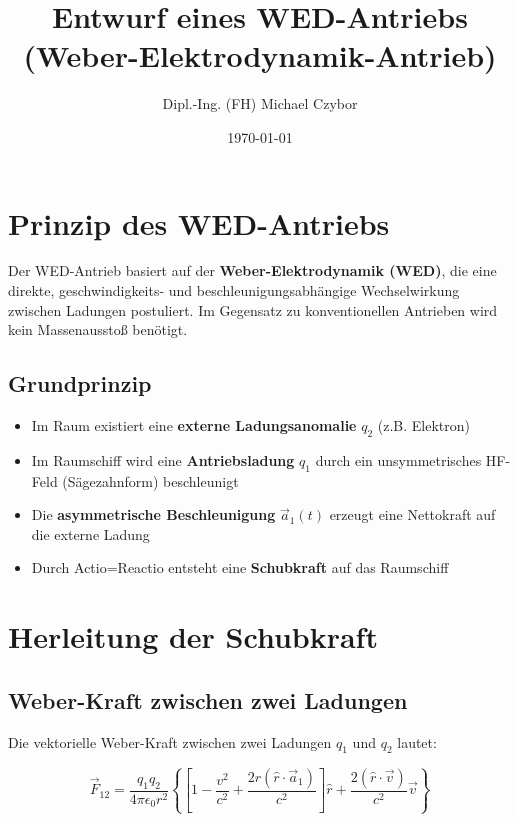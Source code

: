 \documentclass[11pt, a4paper]{article}
\title{Entwurf eines WED-Antriebs \\ (Weber-Elektrodynamik-Antrieb)}
\author{Dipl.-Ing. (FH) Michael Czybor}
\date{\today}
\begin{document}
\maketitle

\section{Prinzip des WED-Antriebs}

Der WED-Antrieb basiert auf der \textbf{Weber-Elektrodynamik (WED)}, die eine direkte, geschwindigkeits- und beschleunigungsabhängige Wechselwirkung zwischen Ladungen
postuliert. Im Gegensatz zu konventionellen Antrieben wird kein Massenausstoß benötigt.

\subsection{Grundprinzip}

\begin{itemize}
    \item Im Raum existiert eine \textbf{externe Ladungsanomalie} $q_2$ (z.B. Elektron)
    \item Im Raumschiff wird eine \textbf{Antriebsladung} $q_1$ durch ein unsymmetrisches HF-Feld (Sägezahnform) beschleunigt
    \item Die \textbf{asymmetrische Beschleunigung} $\vec{a}_1(t)$ erzeugt eine Nettokraft auf die externe Ladung
    \item Durch Actio=Reactio entsteht eine \textbf{Schubkraft} auf das Raumschiff
\end{itemize}

\section{Herleitung der Schubkraft}

\subsection{Weber-Kraft zwischen zwei Ladungen}

Die vektorielle Weber-Kraft zwischen zwei Ladungen $q_1$ und $q_2$ lautet:

\begin{equation}
\vec{F}_{12} = \frac{q_1 q_2}{4\pi\epsilon_0 r^2} 
\left\{ 
\left[1 - \frac{v^2}{c^2} + \frac{2r(\hat{r} \cdot \vec{a}_1)}{c^2}\right] \hat{r} 
+ \frac{2(\hat{r} \cdot \vec{v})}{c^2} \vec{v} 
\right\}
\end{equation}
\end{document}
